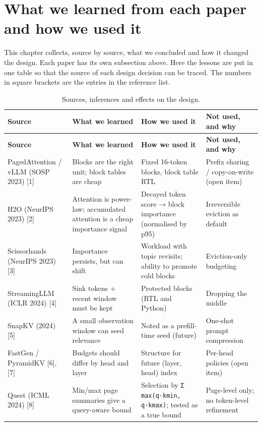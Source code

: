 \documentclass[12pt,a4paper]{report}
\begin{document}
\section{What we learned from each paper and how we used it}\label{sec:11}
This chapter collects, source by source, what we concluded and how it changed the design. Each paper has its own subsection above. Here the lessons are put in one table so that the source of each design decision can be traced. The numbers in square brackets are the entries in the reference list.

{\fontsize{8}{9.5}\selectfont\setlength{\tabcolsep}{3pt}
\begin{longtable}{>{\raggedright\arraybackslash}p{1.40in}>{\raggedright\arraybackslash}p{1.75in}>{\raggedright\arraybackslash}p{1.66in}>{\raggedright\arraybackslash}p{1.05in}}
\caption{Sources, inferences and effects on the design.}\\
\toprule
\textbf{Source} & \textbf{What we learned} & \textbf{How we used it} & \textbf{Not used, and why} \\\midrule\endfirsthead
\toprule \textbf{Source} & \textbf{What we learned} & \textbf{How we used it} & \textbf{Not used, and why} \\\midrule\endhead
\bottomrule\endfoot
PagedAttention / vLLM (SOSP 2023) [1] & Blocks are the right unit; block tables are cheap & Fixed 16-token blocks, block table RTL & Prefix sharing / copy-on-write (open item) \\
H2O (NeurIPS 2023) [2] & Attention is power-law; accumulated attention is a cheap importance signal & Decayed token score → block importance (normalised by p95) & Irreversible eviction as default \\
Scissorhands (NeurIPS 2023) [3] & Importance persists, but can shift & Workload with topic revisits; ability to promote cold blocks & Eviction-only budgeting \\
StreamingLLM (ICLR 2024) [4] & Sink tokens + recent window must be kept & Protected blocks (RTL and Python) & Dropping the middle \\
SnapKV (2024) [5] & A small observation window can seed relevance & Noted as a prefill-time seed (future) & One-shot prompt compression \\
FastGen / PyramidKV [6], [7] & Budgets should differ by head and layer & Structure for future (layer, head) index & Per-head policies (open item) \\
Quest (ICML 2024) [8] & Min/max page summaries give a query-aware bound & Selection by \texttt{Σ max(q·kmin, q·kmax)}; tested as a true bound & Page-level only; no token-level refinement \\

\end{longtable}}
\end{document}

